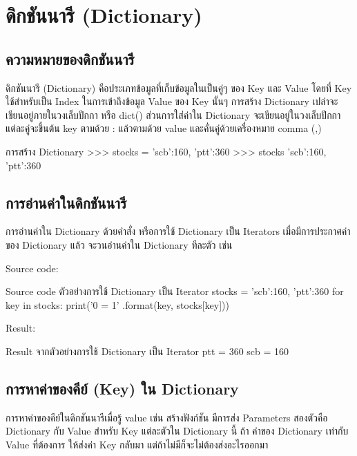 \chapter{ดิกชันนารี (Dictionary)}
\section{ความหมายของดิกชันนารี}

ดิกชันนารี (Dictionary) คือประเภทข้อมูลที่เก็บข้อมูลในเป็นคู่ๆ ของ Key และ Value โดยที่ Key ใช้สำหรับเป็น Index ในการเข้าถึงข้อมูล Value ของ Key นั้นๆ การสร้าง Dictionary เปล่าจะเขียนอยู่ภายในวงเล็บปีกกา { } หรือ dict() ส่วนการใส่ค่าใน Dictionary จะเขียนอยู่ในวงเล็บปีกกา แต่ละคู่จะขึ้นต้น key ตามด้วย : แล้วตามด้วย value และคั่นคู่ด้วยเครื่องหมาย comma (,) 

\begin{codelist}{การสร้าง Dictionary}{}
>>> stocks = {'scb':160, 'ptt':360}
>>> stocks
{'scb':160, 'ptt':360}
\end{codelist}


\section{การอ่านค่าในดิกชันนารี}

การอ่านค่าใน Dictionary ด้วยคำสั่ง  หรือการใช้ Dictionary เป็น Iterators เมื่อมีการประกาศค่าของ Dictionary แล้ว  จะวนอ่านค่าใน Dictionary ทีละตัว เช่น 

\centerline{}

Source code:
\begin{codelist}{Source code ตัวอย่างการใช้ Dictionary เป็น Iterator}{}
stocks = {'scb':160, 'ptt':360}
for key in stocks:
    print('{0} = {1}' .format(key, stocks[key]))
\end{codelist}

Result:
\begin{codelist}{Result จากตัวอย่างการใช้ Dictionary เป็น Iterator}{}
ptt = 360
scb = 160
\end{codelist}


\section{การหาค่าของคีย์ (Key) ใน Dictionary}
การหาค่าของคีย์ในดิกชันนารีเมื่อรู้ value เช่น สร้างฟังก์ชัน  มีการส่ง Parameters สองตัวคือ Dictionary กับ Value สำหรับ Key แต่ละตัวใน Dictionary นี้ ถ้า ค่าของ Dictionary เท่ากับ Value ที่ต้องการ ให้ส่งค่า Key กลับมา แต่ถ้าไม่มีก็จะไม่ต้องส่งอะไรออกมา

